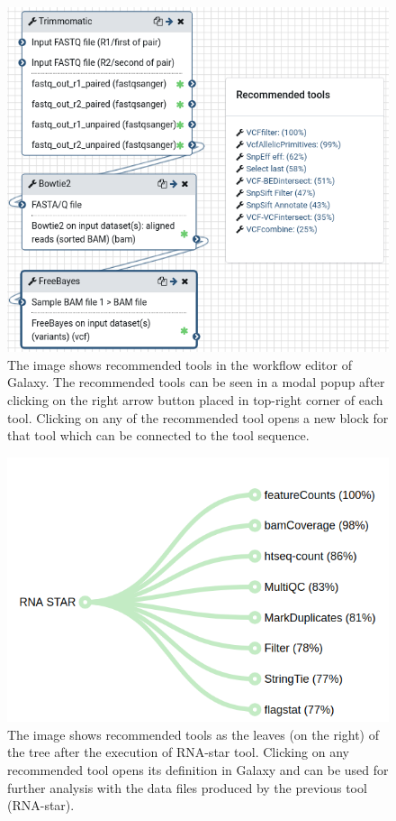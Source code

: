 \documentclass{bioinfo}
\begin{document}
\begin{figure}
\centerline{\includegraphics[scale=0.30]{bioinformatics_journal/images/workflow.png}} \caption{The image shows recommended tools in the workflow editor of Galaxy. The recommended tools can be seen in a modal popup after clicking on the right arrow button placed in top-right corner of each tool. Clicking on any of the recommended tool opens a new block for that tool which can be connected to the tool sequence.}\label{figure:04}
\end{figure}

\begin{figure}
\centerline{\includegraphics[scale=0.25]{bioinformatics_journal/images/tool-exe.png}} \caption{The image shows recommended tools as the leaves (on the right) of the tree after the execution of RNA-star tool. Clicking on any recommended tool opens its definition in Galaxy and can be used for further analysis with the data files produced by the previous tool (RNA-star).}\label{figure:04}
\end{figure}
\end{document}
